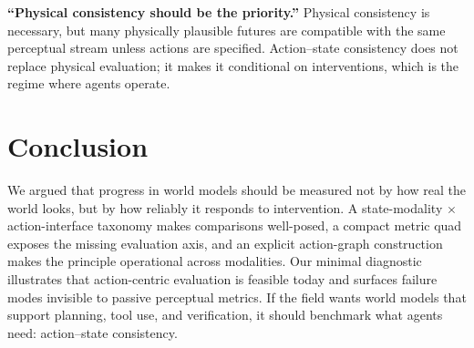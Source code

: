\documentclass{article}
\theoremstyle{plain}
\theoremstyle{definition}
\theoremstyle{remark}
\begin{document}
\textbf{``Physical consistency should be the priority.''}
Physical consistency is necessary, but many physically plausible futures are compatible with the same perceptual stream unless actions are specified. Action--state consistency does not replace physical evaluation; it makes it conditional on interventions, which is the regime where agents operate.

\section{Conclusion}
We argued that progress in world models should be measured not by how real the world looks, but by how reliably it responds to intervention. A state-modality $\times$ action-interface taxonomy makes comparisons well-posed, a compact metric quad exposes the missing evaluation axis, and an explicit action-graph construction makes the principle operational across modalities. Our minimal diagnostic illustrates that action-centric evaluation is feasible today and surfaces failure modes invisible to passive perceptual metrics. If the field wants world models that support planning, tool use, and verification, it should benchmark what agents need: action--state consistency.



\end{document}
